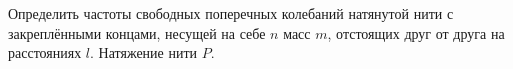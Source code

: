 Определить частоты свободных поперечных колебаний натянутой нити
с закреплёнными концами, несущей на себе $n$ масс $m$,
отстоящих друг от друга на расстояниях $l$.
Натяжение нити $P$.
